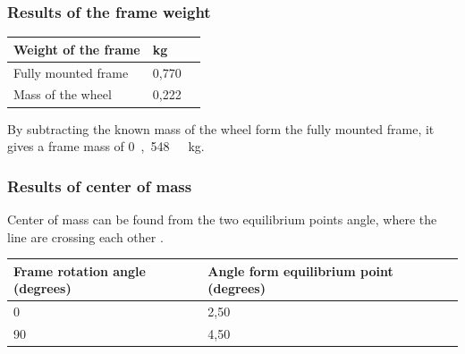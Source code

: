 \subsubsection{Results of the frame weight}
\begin{table}[H]
	\begin{tabular}{|l|l|p{4.3cm}|}
		\hline%
		\textbf{Weight of the frame}       &  \textbf{kg}         \\
		\hline%
		Fully mounted frame        	  & 0,770          \\
		\hline%
		Mass of the wheel        	  & 0,222          \\
		\hline%
	\end{tabular}
\end{table}	
By subtracting the known mass of the wheel form the fully mounted frame, it gives a frame mass of \si{0,548\ kg}.

\subsubsection{Results of center of mass}
Center of mass can be found from the two equilibrium points angle, where the line are crossing each other .
\begin{table}[H]
	\begin{tabular}{|l|l|p{4.3cm}|}
		\hline%
		\textbf{Frame rotation angle (degrees)}       &  \textbf{Angle form equilibrium point (degrees)}         \\
		\hline%
		0                                & 2,50           \\
		\hline%
		90							  & 4,50              \\
		\hline%
	\end{tabular}
\end{table}

